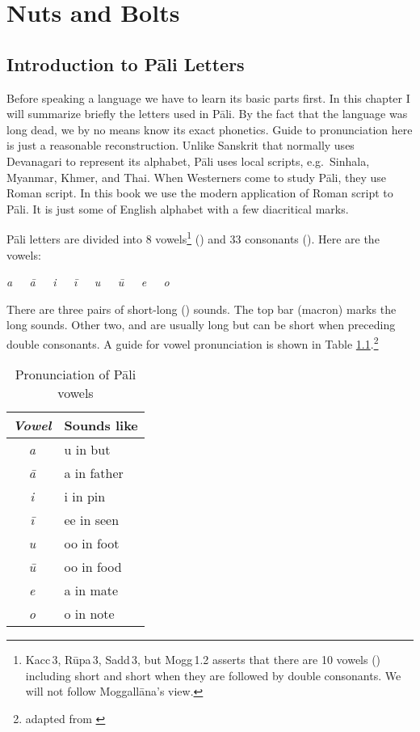 \chapter{Nuts and Bolts}\label{chap:nuts}

{}
\section*{Introduction to P\=ali Letters}

Before speaking a language we have to learn its basic parts first. In this chapter I will summarize briefly the letters used in P\=ali. By the fact that the language was long dead, we by no means know its exact phonetics. Guide to pronunciation here is just a reasonable reconstruction. Unlike Sanskrit that normally uses Devanagari to represent its alphabet, P\=ali uses local scripts, e.g.\ Sinhala, Myanmar, Khmer, and Thai. When Westerners come to study P\=ali, they use Roman script. In this book we use the modern application of Roman script to P\=ali. It is just some of English alphabet with a few diacritical marks.

P\=ali letters are divided into 8 vowels\footnote{Kacc\,3, R\=upa\,3, Sadd\,3, but Mogg\,1.2 asserts that there are 10 vowels () including short  and short  when they are followed by double consonants. We will not follow Moggall\=ana's view.} () and 33 consonants (). Here are the vowels:

\begin{center}
\large \itshape a\ \ \ \=a\ \ \ i\ \ \ \=i\ \ \ u\ \ \ \=u\ \ \ e\ \ \ o
\end{center}

There are three pairs of short-long () sounds. The top bar (macron) marks the long sounds. Other two,  and  are usually long but can be short when preceding double consonants. A guide for vowel pronunciation is shown in Table \ref{tab:vowels}.\footnote{adapted from \citealp[p.~2]{tilbe:grammar}}

\begin{table}[!hbt]
\centering
\caption{Pronunciation of P\=ali vowels}
\label{tab:vowels}
\bigskip
\begin{tabular}{@{}>{\itshape}cl@{}} \toprule
\bfseries\upshape Vowel & \bfseries Sounds like\\ \midrule
a & u in but\\
\=a & a in father\\
i & i in pin\\
\=i & ee in seen\\
u & oo in foot\\
\=u & oo in food\\
e & a in mate\\
o & o in note\\
\bottomrule
\end{tabular}
\end{table}

